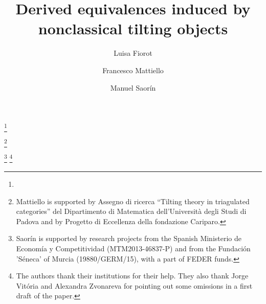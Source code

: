 \documentclass{proc-l}
\theoremstyle{definition}
\theoremstyle{remark}
\numberwithin{equation}{section}
\begin{document}
\title{Derived equivalences induced by nonclassical tilting objects}



\author{Luisa Fiorot}
\address{Dipartimento di Matematica, Universit\`a degli studi di Padova, Via Trieste 63, 35121 Padova (Italy)}
\thanks{}

\author{Francesco Mattiello}
\address{Dipartimento di Matematica, Universit\`a degli studi di Padova,  Via Trieste 63, 35121 Padova (Italy)}
\thanks{Mattiello is supported by Assegno di ricerca ``Tilting theory in triagulated categories'' del Dipartimento di Matematica dell'Universit\`a degli Studi di Padova  and by Progetto di Eccellenza della fondazione Cariparo.}

\author{Manuel Saor\'in}
\address{Departamento de Matem\'aticas, Universidad de Murcia, Aptdo. 4021, 30100 Espinardo, Murcia (Spain)}
\thanks{Saor\'in is
supported by research projects from the Spanish Ministerio de Econom\'ia y Competitividad (MTM2013-46837-P)  and from the Fundaci\'on 'S\'eneca'
of Murcia (19880/GERM/15), with a part of FEDER funds.}
\thanks{The authors thank their institutions for their help. They also thank Jorge Vit\'oria and Alexandra Zvonareva for pointing out some omissions in a first draft of the paper.}



\date{}

\dedicatory{}

\end{document}
